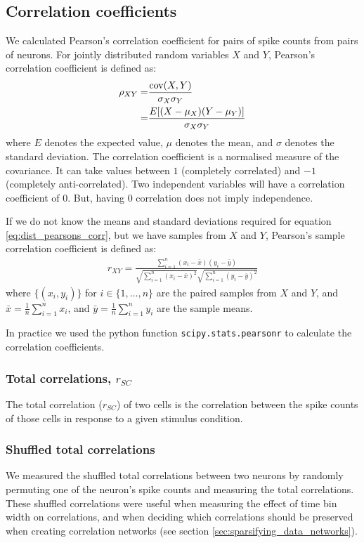     \subsection{Correlation coefficients}
    We calculated Pearson's correlation coefficient for pairs of spike counts from pairs of neurons. For jointly distributed random variables $X$ and $Y$, Pearson's correlation coefficient is defined as:
    \begin{align}\label{eq:dist_pearsons_corr}
        \rho_{XY} =& \frac{\text{cov}(X,Y)}{\sigma_X \sigma_Y} \\
                  =& \frac{E[(X - \mu_X)(Y - \mu_Y)]}{\sigma_X \sigma_Y}
    \end{align}
    where $E$ denotes the expected value, $\mu$ denotes the mean, and $\sigma$ denotes the standard deviation. The correlation coefficient is a normalised measure of the covariance. It can take values between $1$ (completely correlated) and $-1$ (completely anti-correlated). Two independent variables will have a correlation coefficient of $0$. But, having $0$ correlation does not imply independence.

    If we do not know the means and standard deviations required for equation \ref{eq:dist_pearsons_corr}, but we have samples from $X$ and $Y$, Pearson's sample correlation coefficient is defined as:
    \begin{align}
        r_{XY} = \frac{\sum_{i=1}^n (x_i - \bar{x})(y_i - \bar{y})}{\sqrt{\sum_{i=1}^n (x_i - \bar{x})^2}\sqrt{\sum_{i=1}^n (y_i - \bar{y})^2}}
    \end{align}
    where $\lbrace (x_i, y_i) \rbrace$ for $i \in \lbrace 1, \dots, n \rbrace$ are the paired samples from $X$ and $Y$, and $\bar{x} = \frac{1}{n}\sum_{i=1}^n x_i$, and $\bar{y} = \frac{1}{n}\sum_{i=1}^n y_i$ are the sample means.

    In practice we used the python function \texttt{scipy.stats.pearsonr} to calculate the correlation coefficients.

        \subsubsection{Total correlations, $r_{SC}$}\label{sec:spike_count_correlation}
        The total correlation ($r_{SC}$) of two cells is the correlation between the spike counts of those cells in response to a given stimulus condition.

        \subsubsection{Shuffled total correlations}\label{sec:shuffled_correlations}
        We measured the shuffled total correlations between two neurons by randomly permuting one of the neuron's spike counts and measuring the total correlations. These shuffled correlations were useful when measuring the effect of time bin width on correlations, and when deciding which correlations should be preserved when creating correlation networks (see section \ref{sec:sparsifying_data_networks}).

